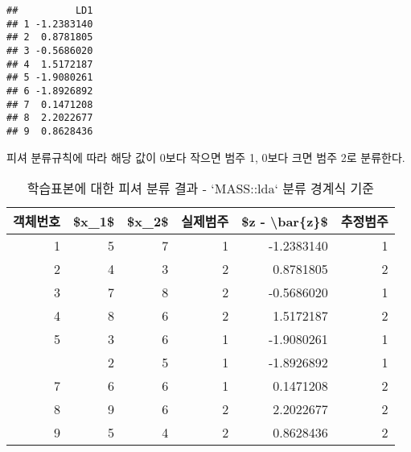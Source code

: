 \documentclass[]{book}
\newenvironment{Shaded}{\begin{snugshade}}{\end{snugshade}}
\newcommand{\CharTok}[1]{\textcolor[rgb]{0.31,0.60,0.02}{#1}}
\newcommand{\DataTypeTok}[1]{\textcolor[rgb]{0.13,0.29,0.53}{#1}}
\newcommand{\DecValTok}[1]{\textcolor[rgb]{0.00,0.00,0.81}{#1}}
\newcommand{\KeywordTok}[1]{\textcolor[rgb]{0.13,0.29,0.53}{\textbf{#1}}}
\newcommand{\NormalTok}[1]{#1}
\newcommand{\OperatorTok}[1]{\textcolor[rgb]{0.81,0.36,0.00}{\textbf{#1}}}
\newcommand{\OtherTok}[1]{\textcolor[rgb]{0.56,0.35,0.01}{#1}}
\newcommand{\StringTok}[1]{\textcolor[rgb]{0.31,0.60,0.02}{#1}}
\begin{document}
\begin{verbatim}
##          LD1
## 1 -1.2383140
## 2  0.8781805
## 3 -0.5686020
## 4  1.5172187
## 5 -1.9080261
## 6 -1.8926892
## 7  0.1471208
## 8  2.2022677
## 9  0.8628436
\end{verbatim}

피셔 분류규칙에 따라 해당 값이 0보다 작으면 범주 1, 0보다 크면 범주 2로 분류한다.

\begin{Shaded}
\end{Shaded}

\begin{table}[t]

\caption{\label{tab:fisher-da-result-lda}학습표본에 대한 피셔 분류 결과 - `MASS::lda` 분류 경계식 기준}
\centering
\begin{tabular}{rrrrrr}
\toprule
객체번호 & \$x\_1\$ & \$x\_2\$ & 실제범주 & \$z - \textbackslash{}bar\{z\}\$ & 추정범주\\
\midrule
1 & 5 & 7 & 1 & -1.2383140 & 1\\
2 & 4 & 3 & 2 & 0.8781805 & 2\\
3 & 7 & 8 & 2 & -0.5686020 & 1\\
4 & 8 & 6 & 2 & 1.5172187 & 2\\
5 & 3 & 6 & 1 & -1.9080261 & 1\\
\addlinespace
6 & 2 & 5 & 1 & -1.8926892 & 1\\
7 & 6 & 6 & 1 & 0.1471208 & 2\\
8 & 9 & 6 & 2 & 2.2022677 & 2\\
9 & 5 & 4 & 2 & 0.8628436 & 2\\
\bottomrule
\end{tabular}
\end{table}
\end{document}
